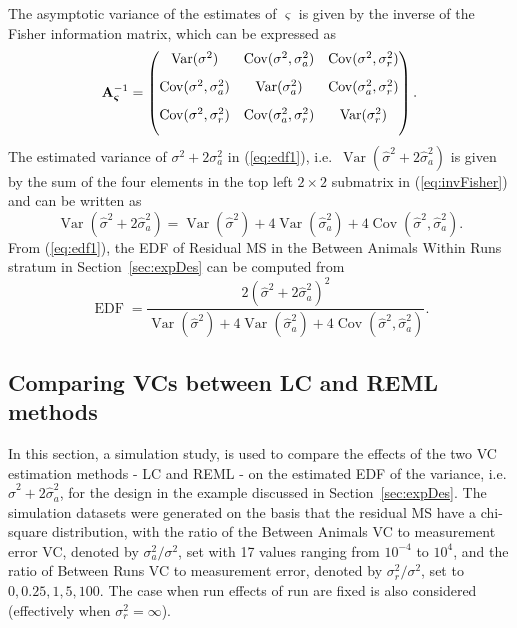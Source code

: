 The asymptotic variance of the estimates of $\bm{\varsigma}$ is given by the inverse of the Fisher information matrix, which can be expressed as 
\begin{equation}\label{eq:invFisher}
\A^{-1}_{\bm{\varsigma}} = 
\begin{pmatrix}            
\vspace{8pt}  \operatorname{Var}(\sigma^2) &  \operatorname{Cov}(\sigma^2,\sigma_a^2) &  \operatorname{Cov}(\sigma^2,\sigma_r^2)  \\ 
\vspace{8pt} \operatorname{Cov}(\sigma^2,\sigma_a^2) &  \operatorname{Var}(\sigma_a^2) &  \operatorname{Cov}(\sigma_a^2,\sigma_r^2) \\
\vspace{8pt} \operatorname{Cov}(\sigma^2,\sigma_r^2) &  \operatorname{Cov}(\sigma_a^2,\sigma_r^2) &  \operatorname{Var}(\sigma_r^2)   \\
\end{pmatrix}. 
\end{equation}
The estimated variance of $\sigma^2 + 2\sigma_a^2$ in (\ref{eq:edf1}), i.e.\ $\operatorname{Var}(\hat{\sigma}^2 + 2\hat{\sigma}_a^2)$ is given by the sum of the four elements in the top left $2\times2$ submatrix in (\ref{eq:invFisher}) and can be written as  
\[
\operatorname{Var}(\hat{\sigma}^2 + 2\hat{\sigma}_a^2) = \operatorname{Var}(\hat{\sigma}^2) + 4\operatorname{Var}(\hat{\sigma}_a^2) + 4\operatorname{Cov}(\hat{\sigma}^2,\hat{\sigma}_a^2).
\]  
From (\ref{eq:edf1}), the EDF of Residual MS in the Between Animals Within Runs stratum in Section~\ref{sec:expDes} can be computed from 
\[
\operatorname{EDF} = \dfrac{2(\hat{\sigma}^2 + 2\hat{\sigma}_a^2)^2}{\operatorname{Var}(\hat{\sigma}^2) + 4\operatorname{Var}(\hat{\sigma}_a^2) + 4\operatorname{Cov}(\hat{\sigma}^2,\hat{\sigma}_a^2)}.
\]

\subsection{Comparing VCs between LC and REML methods}
In this section, a simulation study, is used to compare the effects of the two VC estimation methods - LC and REML - on the estimated EDF of the variance, i.e. $\hat{\sigma}^2+2\hat{\sigma}_{a}^2$, for the design in the example discussed in Section~\ref{sec:expDes}. The simulation datasets were generated on the basis that the residual MS have a chi-square distribution, with the ratio of the Between Animals VC to measurement error VC, denoted by $\sigma_a^2/\sigma^2$, set with 17 values ranging from $10^{-4}$ to $10^4$, and the ratio of Between Runs VC to measurement error, denoted by $\sigma_r^2/\sigma^2$, set to $0, 0.25, 1, 5, 100$. The case when run effects of run are fixed is also considered (effectively when $\sigma _r^2 = \infty$). 

